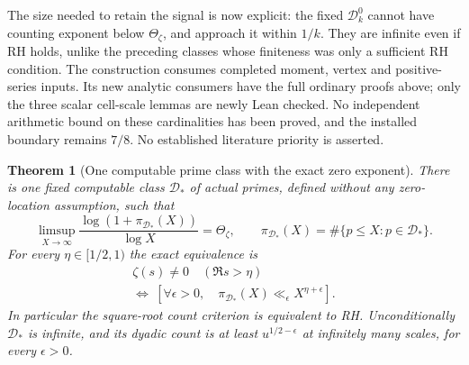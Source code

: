 \documentclass[11pt]{article}
\newtheorem{theorem}{Theorem}[section]
\theoremstyle{definition}
\begin{document}
The size needed to retain the signal is now explicit:
the fixed $\mathcal D_k^0$ cannot have counting exponent
below $\Theta_\zeta$, and approach it within $1/k$.
They are infinite even if RH holds, unlike the preceding
classes whose finiteness was only a sufficient RH condition.
The construction consumes completed moment, vertex and
positive-series inputs. Its new analytic consumers have
the full ordinary proofs above; only the three scalar
cell-scale lemmas are newly Lean checked.
No independent arithmetic bound on these cardinalities
has been proved, and the installed boundary remains $7/8$.
No established literature priority is asserted.

\begin{theorem}[One computable prime class with the exact zero exponent]
\label{thm:single-computable-prime-RH}
There is one fixed computable class $\mathcal D_*$ of actual
primes, defined without any zero-location assumption, such that
\begin{equation}
 \limsup_{X\to\infty}
       \frac{\log(1+\pi_{\mathcal D_*}(X))}{\log X}
                         =\Theta_\zeta,\qquad
 \pi_{\mathcal D_*}(X)=\#\{p\le X:p\in\mathcal D_*\}.
 \label{eq:single-prime-class-zero-exponent}
\end{equation}
For every $\eta\in[1/2,1)$ the exact equivalence is
\begin{equation}
 \begin{gathered}
 \zeta(s)\ne0\quad(\Re s>\eta)\\
 \Longleftrightarrow\
 \left[\forall\epsilon>0,\quad
   \pi_{\mathcal D_*}(X)\ll_\epsilon X^{\eta+\epsilon}\right].
 \end{gathered}
 \label{eq:single-prime-class-strip-equivalence}
\end{equation}
In particular the square-root count criterion is equivalent
to RH. Unconditionally $\mathcal D_*$ is infinite, and its
dyadic count is at least $u^{1/2-\epsilon}$ at infinitely
many scales, for every $\epsilon>0$.
\end{theorem}
\end{document}
